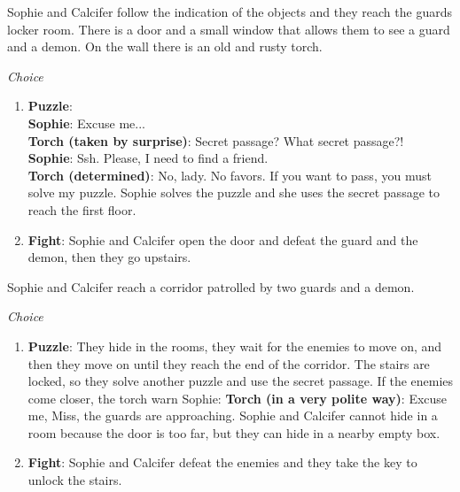 \vspace{1em}


Sophie and Calcifer follow the indication of the objects and they reach the guards locker room. There is a door and a small window that allows them to see a guard and a demon. On the wall there is an old and rusty torch.

\textit{Choice}
\begin{enumerate}
  \item \textbf{Puzzle}:\\
    \textbf{Sophie}: Excuse me...\\
    \textbf{Torch (taken by surprise)}: Secret passage? What secret passage?!\\
    \textbf{Sophie}: Ssh. Please, I need to find a friend. \\
    \textbf{Torch (determined)}: No, lady. No favors. If you want to pass, you must solve my puzzle.
    Sophie solves the puzzle and she uses the secret passage to reach the first floor.

  \item \textbf{Fight}: Sophie and Calcifer open the door and defeat the guard and the demon, then they go upstairs.
\end{enumerate}


Sophie and Calcifer reach a corridor patrolled by two guards and a demon.

\textit{Choice}
\begin{enumerate}
  \item \textbf{Puzzle}: They hide in the rooms, they wait for the enemies to move on, and then they move on until they reach the end of the corridor. The stairs are locked, so they solve another puzzle and use the secret passage.
  If the enemies come closer, the torch warn Sophie:
  \textbf{Torch (in a very polite way)}: Excuse me, Miss, the guards are approaching.
  Sophie and Calcifer cannot hide in a room because the door is too far, but they can hide in a nearby empty box.

  \item \textbf{Fight}: Sophie and Calcifer defeat the enemies and they take the key to unlock the stairs.
\end{enumerate}



